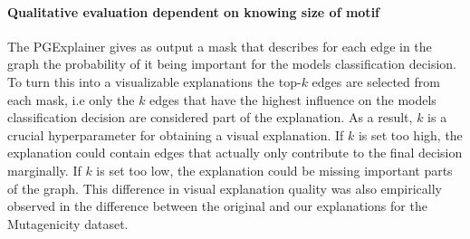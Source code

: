 




\paragraph{Qualitative evaluation dependent on knowing size of motif}
The PGExplainer gives as output a mask that describes for each edge in the graph the probability of it being important for the models classification decision. To turn this into a visualizable explanations the top-$k$ edges are selected from each mask, i.e only the $k$ edges that have the highest influence on the models classification decision are considered part of the explanation. As a result, $k$ is a crucial hyperparameter for obtaining a visual explanation. If $k$ is set too high, the explanation could contain edges that actually only contribute to the final decision marginally. If $k$ is set too low, the explanation could be missing important parts of the graph. This difference in visual explanation quality was also empirically observed in the difference between the original and our explanations for the Mutagenicity dataset. 

